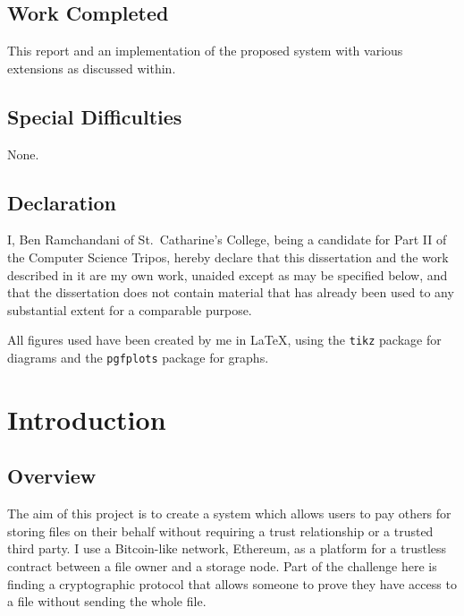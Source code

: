 \documentclass[12pt,a4paper,twoside,openright]{report}
\begin{document}
\section*{Work Completed}
\vspace{-0.3em}
This report and an implementation of the proposed system with various extensions as discussed within.
\vspace{-0.3em}
\section*{Special Difficulties}
\vspace{-0.3em}
None.
\vspace{-0.3em}
\section*{Declaration}
\vspace{-0.3em}
I, Ben Ramchandani of St.\ Catharine's College, being a candidate for Part II of the Computer
Science Tripos, hereby declare
that this dissertation and the work described in it are my own work,
unaided except as may be specified below, and that the dissertation
does not contain material that has already been used to any substantial
extent for a comparable purpose.

\medskip
{}

\smallskip
{}

\newpage


\tableofcontents

\listoffigures

All figures used have been created by me in \LaTeX, using the \texttt{tikz} package for diagrams and the \texttt{pgfplots} package for graphs.

\chapter{Introduction}

\section{Overview}

The aim of this project is to create a system which allows users to pay others for storing files on their behalf without requiring a trust relationship or a trusted third party.
I use a Bitcoin-like network, Ethereum, as a platform for a trustless contract between a file owner and a storage node.
Part of the challenge here is finding a cryptographic protocol that allows someone to prove they have access to a file without sending the whole file.
\end{document}
